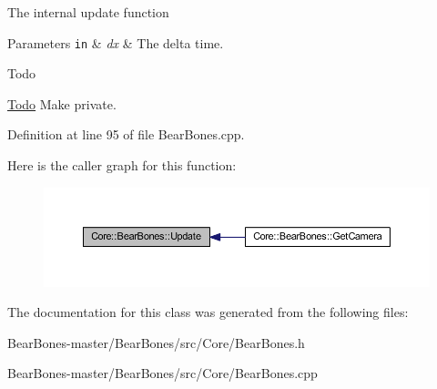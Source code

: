 The internal update function 
\begin{DoxyParams}[1]{Parameters}
\mbox{\tt in}  & {\em dx} & The delta time. \\
\hline
\end{DoxyParams}
\begin{DoxyRefDesc}{Todo}
\item[\hyperlink{todo__todo000003}{Todo}]Make private. \end{DoxyRefDesc}


Definition at line 95 of file Bear\+Bones.\+cpp.

Here is the caller graph for this function\+:
\nopagebreak
\begin{figure}[H]
\begin{center}
\leavevmode
\includegraphics[width=350pt]{class_core_1_1_bear_bones_a5d424aa025bfbefd266e7777c657ebd9_icgraph}
\end{center}
\end{figure}


The documentation for this class was generated from the following files\+:\begin{DoxyCompactItemize}
\item 
Bear\+Bones-\/master/\+Bear\+Bones/src/\+Core/Bear\+Bones.\+h\item 
Bear\+Bones-\/master/\+Bear\+Bones/src/\+Core/Bear\+Bones.\+cpp\end{DoxyCompactItemize}
